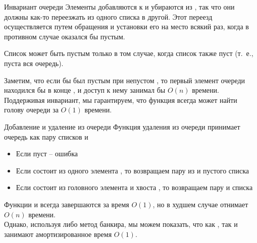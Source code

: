 \begin{frame}{Инвариант очереди}
Элементы добавляются к  и убираются из , так
что они должны как-то переезжать из одного списка в другой. Этот
переезд осуществляется путем обращения  и установки его
на место  всякий раз, когда в противном случае
 оказался бы пустым.\\

\begin{definition}
Список  может быть пустым только в том
случае, когда список  также пуст (т.~е., пуста вся
очередь).
\end{definition}
\vspace{1em}

Заметим, что если бы  был пустым при непустом
, то первый элемент очереди находился бы в конце
, и доступ к нему занимал бы $O(n)$ времени. Поддерживая
инвариант, мы гарантируем, что функция  всегда может
найти голову очереди за $O(1)$ времени.

\end{frame}


\begin{frame}[fragile]{Добавление и удаление из очереди}
Функция удаления из очереди 
принимает очередь как пару  списков  и 
\begin{itemize}
\item Если   пуст -- ошибка
\item Если  состоит из одного элемента , то возвращаем пару из   и пустого списка
\item Если  состоит из головного элемента  и хвоста , то возвращаем пару  и списка 
\end{itemize}
\vspace{1em}

Функции
 и  всегда завершаются за время
$O(1)$, но  в худшем случае отнимает $O(n)$
времени. \\

Однако, используя либо метод банкира, мы
можем показать, что как , так и 
занимают амортизированное время $O(1)$.
\end{frame}


